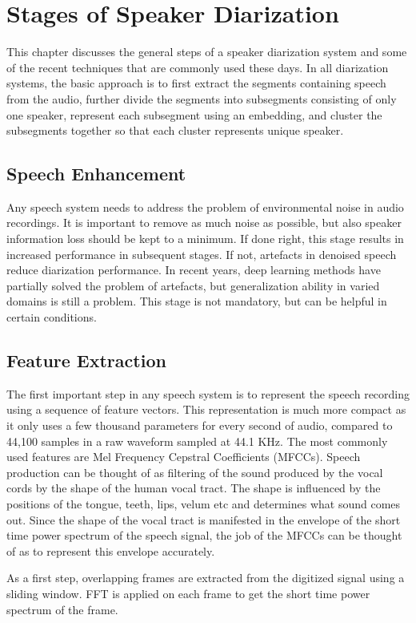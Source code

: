 \chapter{Stages of Speaker Diarization}
This chapter discusses the general steps of a speaker diarization system and some of the recent techniques that are commonly used these days. In all diarization systems, the basic approach is to first extract the segments containing speech from the audio, further divide the segments into subsegments consisting of only one speaker, represent each subsegment using an embedding, and cluster the subsegments together so that each cluster represents unique speaker.

\section{Speech Enhancement}
Any speech system needs to address the problem of environmental noise in audio recordings. It is important to remove as much noise as possible, but also speaker information loss should be kept to a minimum. If done right, this stage results in increased performance in subsequent stages. If not, artefacts in denoised speech reduce diarization performance. In recent years, deep learning methods have partially solved the problem of artefacts, but generalization ability in varied domains is still a problem. This stage is not mandatory, but can be helpful in certain conditions.

\section{Feature Extraction}
The first important step in any speech system is to represent the speech recording using a sequence of feature vectors. This representation is much more compact as it only uses a few thousand parameters for every second of audio, compared to 44,100 samples in a raw waveform sampled at 44.1 KHz. The most commonly used features are Mel Frequency Cepstral Coefficients (MFCCs). Speech production can be thought of as filtering of the sound produced by the vocal cords by the shape of the human vocal tract. The shape is influenced by the positions of the tongue, teeth, lips, velum etc and determines what sound comes out. Since the shape of the vocal tract is manifested in the envelope of the short time power spectrum of the speech signal, the job of the MFCCs can be thought of as to represent this envelope accurately.

As a first step, overlapping frames are extracted from the digitized signal using a sliding window. FFT is applied on each frame to get the short time power spectrum of the frame.
				
